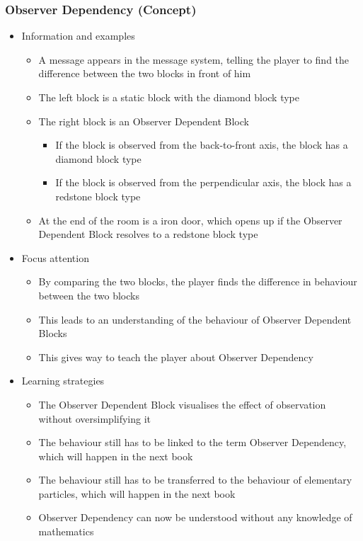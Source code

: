 \documentclass[11pt,twoside]{report} %
\begin{document}
\subsubsection{Observer Dependency (Concept)}
	\begin{itemize}
		\item Information and examples
		\begin{itemize}
			\item A message appears in the message system, telling the player to find the difference between the two blocks in front of him
			\item The left block is a static block with the diamond block type
			\item The right block is an Observer Dependent Block
			\begin{itemize}
				\item If the block is observed from the back-to-front axis, the block has a diamond block type
				\item If the block is observed from the perpendicular axis, the block has a redstone block type
			\end{itemize}
			\item At the end of the room is a iron door, which opens up if the Observer Dependent Block resolves to a redstone block type
		\end{itemize}
		\item Focus attention
		\begin{itemize}
			\item By comparing the two blocks, the player finds the difference in behaviour between the two blocks
			\item This leads to an understanding of the behaviour of Observer Dependent Blocks
			\item This gives way to teach the player about Observer Dependency
		\end{itemize}
		\item Learning strategies
		\begin{itemize}
			\item The Observer Dependent Block visualises the effect of observation without oversimplifying it
			\item The behaviour still has to be linked to the term Observer Dependency, which will happen in the next book
			\item The behaviour still has to be transferred to the behaviour of elementary particles, which will happen in the next book
			\item Observer Dependency can now be understood without any knowledge of mathematics

\end{itemize}
\end{itemize}
\end{document}
